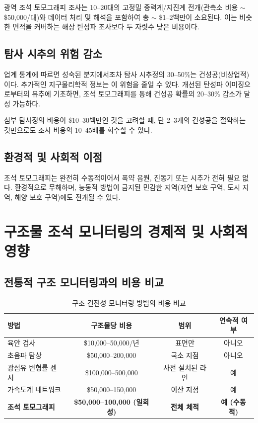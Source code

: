 \documentclass[12pt,a4paper]{article}
\theoremstyle{remark}
\begin{document}
	광역 조석 토모그래피 조사는 10–20대의 고정밀 중력계/지진계 전개(관측소 비용 \(\sim\) \$50,000/대)와 데이터 처리 및 해석을 포함하여 총 \(\sim\) \$1–2백만이 소요된다. 이는 비슷한 면적을 커버하는 해상 탄성파 조사보다 두 자릿수 낮은 비용이다.
	
	\subsection{탐사 시추의 위험 감소}
	
	업계 통계에 따르면 성숙된 분지에서조차 탐사 시추정의 30–50\%는 건성공(비상업적)이다. 추가적인 지구물리학적 정보는 이 위험을 줄일 수 있다. 개선된 탄성파 이미징으로부터의 유추에 기초하면, 조석 토모그래피를 통해 건성공 확률의 20–30\% 감소가 달성 가능하다.
	
	심부 탐사정의 비용이 \$10–30백만인 것을 고려할 때, 단 2–3개의 건성공을 절약하는 것만으로도 조사 비용의 10–45배를 회수할 수 있다.
	
	\subsection{환경적 및 사회적 이점}
	
	조석 토모그래피는 완전히 수동적이어서 폭약 음원, 진동기 또는 시추가 전혀 필요 없다. 환경적으로 무해하며, 능동적 방법이 금지된 민감한 지역(자연 보호 구역, 도시 지역, 해양 보호 구역)에도 전개될 수 있다.
	
	\section{구조물 조석 모니터링의 경제적 및 사회적 영향}
	\label{sec:structural-economics}
	
	\subsection{전통적 구조 모니터링과의 비용 비교}
	
	\begin{table}[htbp]
		\centering
		\caption{구조 건전성 모니터링 방법의 비용 비교}
		\label{tab:structural-costs}
		\small
		\begin{tabular}{lccc}
			\toprule
			\textbf{방법} & \textbf{구조물당 비용} & \textbf{범위} & \textbf{연속적 여부} \\
			\midrule
			육안 검사 & \$10,000–50,000/년 & 표면만 & 아니오 \\
			초음파 탐상 & \$50,000–200,000 & 국소 지점 & 아니오 \\
			광섬유 변형률 센서 & \$100,000–500,000 & 사전 설치된 라인 & 예 \\
			가속도계 네트워크 & \$50,000–150,000 & 이산 지점 & 예 \\
			\textbf{조석 토모그래피} & \textbf{\$50,000–100,000 (일회성)} & \textbf{전체 체적} & \textbf{예 (수동적)} \\
			\bottomrule
		\end{tabular}
	\end{table}
	
\end{document}
